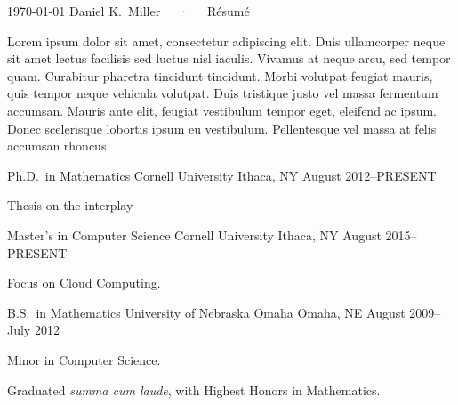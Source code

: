 \documentclass[11pt, letterpaper]{awesome-cv}
\begin{document}
\makecvheader

\makecvfooter
  {\today}
  {Daniel K.~Miller~~~·~~~Résumé}
  {\thepage}



\begin{cvparagraph}

Lorem ipsum dolor sit amet, consectetur adipiscing elit. Duis ullamcorper neque sit amet lectus facilisis sed luctus nisl iaculis. Vivamus at neque arcu, sed tempor quam. Curabitur pharetra tincidunt tincidunt. Morbi volutpat feugiat mauris, quis tempor neque vehicula volutpat. Duis tristique justo vel massa fermentum accumsan. Mauris ante elit, feugiat vestibulum tempor eget, eleifend ac ipsum. Donec scelerisque lobortis ipsum eu vestibulum. Pellentesque vel massa at felis accumsan rhoncus.
\end{cvparagraph}






\begin{cventries}

\cventry
	{Ph.D.~in Mathematics}
	{Cornell University}
	{Ithaca, NY}
	{August 2012--PRESENT}
	{
		\begin{cvitems}
			\item{Thesis on the interplay}
		\end{cvitems}
	}
	
\cventry
	{Master's in Computer Science}
	{Cornell University}
	{Ithaca, NY}
	{August 2015--PRESENT}
	{
		\begin{cvitems}
			\item{Focus on Cloud Computing.}
		\end{cvitems}
	}
	
\cventry
	{B.S.~in Mathematics}
	{University of Nebraska Omaha}
	{Omaha, NE}
	{August 2009--July 2012}
	{
		\begin{cvitems}
			\item{Minor in Computer Science.}
			\item{Graduated \emph{summa cum laude}, with Highest Honors in Mathematics.}
		\end{cvitems}
	}
	
\end{cventries}
\end{document}
